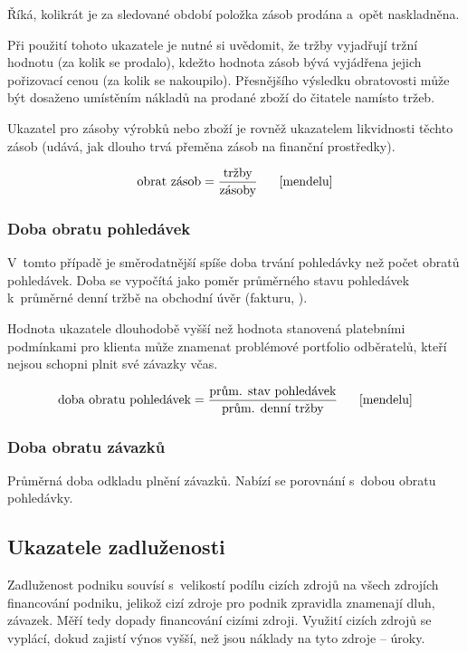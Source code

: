 Říká, kolikrát je za sledované období položka zásob prodána a~opět naskladněna.

Při použití tohoto ukazatele je nutné si uvědomit, že tržby vyjadřují tržní hodnotu (za kolik se prodalo), kdežto hodnota zásob bývá vyjádřena jejich pořizovací cenou (za kolik se nakoupilo). Přesnějšího výsledku obratovosti může být dosaženo umístěním nákladů na prodané zboží do čitatele namísto tržeb.

Ukazatel pro zásoby výrobků nebo zboží je rovněž ukazatelem likvidnosti těchto zásob (udává, jak dlouho trvá přeměna zásob na finanční prostředky).

$$\vz{obrat zásob}{tržby}{zásoby} \scite{mendelu}$$


\subsubsection{Doba obratu pohledávek}
V~tomto případě je směrodatnější spíše doba trvání pohledávky než počet obratů pohledávek. Doba se vypočítá jako poměr průměrného stavu pohledávek k~průměrné denní tržbě na obchodní úvěr (fakturu, ).

Hodnota ukazatele dlouhodobě vyšší než hodnota stanovená platebními podmínkami pro klienta může znamenat problémové portfolio odběratelů, kteří nejsou schopni plnit své závazky včas.

$$\vz{doba obratu pohledávek}{prům. stav pohledávek}{prům. denní tržby} \scite{mendelu}$$

\subsubsection{Doba obratu závazků}
Průměrná doba odkladu plnění závazků. Nabízí se porovnání s~dobou obratu pohledávky. 





\subsection{Ukazatele zadluženosti}

Zadluženost podniku souvísí s~velikostí podílu cizích zdrojů na všech zdrojích financování podniku, jelikož cizí zdroje pro podnik zpravidla znamenají dluh, závazek. Měří tedy dopady financování cizími zdroji. Využití cizích zdrojů se vyplácí, dokud zajistí výnos vyšší, než jsou náklady na tyto zdroje -- úroky.

